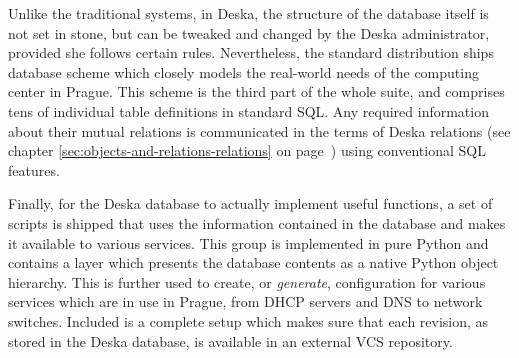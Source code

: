 \documentclass[deska]{subfiles}
\begin{document}
Unlike the traditional systems, in Deska, the structure of the database itself is not set in stone, but can be tweaked
and changed by the Deska administrator, provided she follows certain rules.  Nevertheless, the standard distribution
ships database scheme which closely models the real-world needs of the computing center in Prague.  This scheme is the
third part of the whole suite, and comprises tens of individual table definitions in standard SQL.  Any required
information about their mutual relations is communicated in the terms of Deska relations (see chapter
\ref{sec:objects-and-relations-relations} on page~\pageref{sec:objects-and-relations-relations}) using conventional SQL
features.

Finally, for the Deska database to actually implement useful functions, a set of scripts is shipped that uses the
information contained in the database and makes it available to various services.  This group is implemented in pure
Python and contains a layer which presents the database contents as a native Python object hierarchy.  This is further
used to create, or {\em generate}, configuration for various services which are in use in Prague, from DHCP servers and
DNS to network switches.  Included is a complete setup which makes sure that each revision, as stored in the Deska
database, is available in an external VCS repository.
\end{document}
